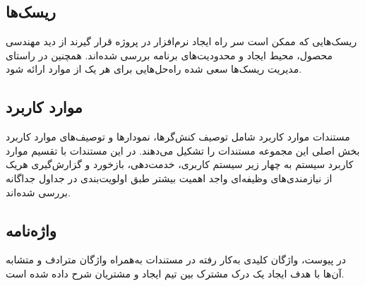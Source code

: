\subsection{ریسک‌ها}
ریسک‌هایی که ممکن است سر راه ایجاد نرم‌افزار در پروژه قرار گیرند از دید مهندسی محصول، محیط ایجاد و محدودیت‌های برنامه بررسی شده‌اند. همچنین در راستای مدیریت ریسک‌ها سعی شده راه‌حل‌هایی برای هر یک از موارد ارائه شود.
\subsection{موارد کاربرد}
مستندات موارد کاربرد شامل توصیف کنش‌گرها، نمودارها و توصیف‌های موارد کاربرد بخش اصلی این مجموعه مستندات را تشکیل می‌دهند. در این مستندات با تقسیم موارد کاربرد سیستم به چهار زیر سیستم کاربری، خدمت‌دهی، بازخورد و گزارش‌گیری هریک از نیازمندی‌های وظیفه‌ای واجد اهمیت بیشتر طبق اولویت‌بندی در جداول جداگانه بررسی شده‌اند.
\subsection{واژه‌نامه}
در پیوست، واژگان کلیدی به‌کار رفته در مستندات به‌همراه واژگان مترادف و متشابه آن‌ها با هدف ایجاد یک درک مشترک بین تیم ایجاد و مشتریان شرح داده شده است.

